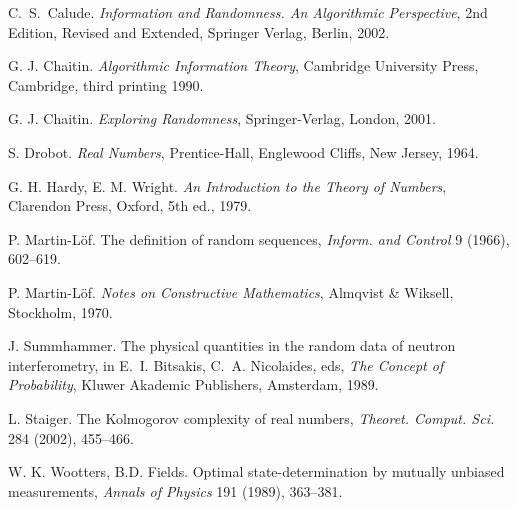 \documentclass[11pt,a4paper,twoside]{article}
\begin{document}
\begin{thebibliography}{99}%
 C.~S.~Calude. \textsl{Information and Randomness. An
Algorithmic
    Perspective}, 2nd Edition, Revised and Extended, Springer Verlag,
Berlin,
  2002.

G. J. Chaitin. {\em Algorithmic Information Theory},
Cambridge University Press, Cambridge,  third printing 1990.

  G. J. Chaitin. {\em Exploring
Randomness}, Springer-Verlag,
London, 2001.

 S. Drobot. {\em Real Numbers}, Prentice-Hall, Englewood
Cliffs, New Jersey, 1964.

G. H. Hardy, E. M. Wright. {\em An
Introduction to the Theory of
Numbers}, Clarendon Press, Oxford, 5th ed., 1979.

 P. Martin-L\"{o}f. The definition of random sequences,
  \textsl{Inform.  and Control} 9 (1966), 602--619.

 P. Martin-L\"{o}f. \textsl{Notes on Constructive
Mathematics},
  Almqvist \& Wiksell, Stockholm, 1970.

J. Summhammer.
 The physical quantities in the random data of neutron interferometry,
in E.~I. Bitsakis,  C.~A. Nicolaides, eds, {\em The Concept of
  Probability},  Kluwer Akademic Publishers, Amsterdam, 1989.


  L. Staiger. The Kolmogorov complexity of real numbers,
 {\em Theoret. Comput. Sci.} 284 (2002), 455--466.

W. K. Wootters,  B.D. Fields.
Optimal state-determination by mutually unbiased measurements,
 {\em Annals of Physics} 191 (1989), 363--381.



\end{thebibliography}


%
%
%
\end{document}
